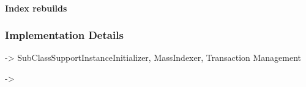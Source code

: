 \paragraph{Index rebuilds}

\subsubsection{Implementation Details}

-> SubClassSupportInstanceInitializer, MassIndexer, Transaction Management





-> 


\pagebreak